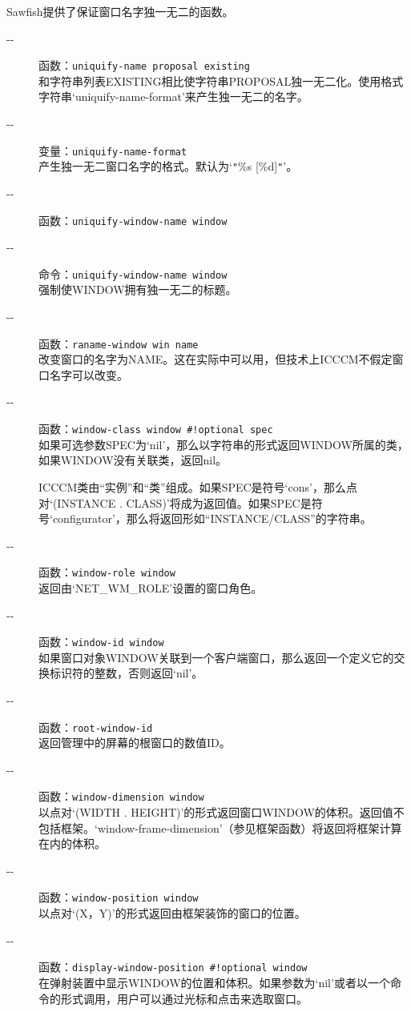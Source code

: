 \documentclass{book}
\begin{document}
\begin{CJK*}{UTF8}{gbsn}
Sawfish提供了保证窗口名字独一无二的函数。
\begin{description}
\item[-{}-] 函数：\verb|uniquify-name proposal existing|\\
和字符串列表EXISTING相比使字符串PROPOSAL独一无二化。使用格式字符串`uniquify-name-format'来产生独一无二的名字。
\item[-{}-] 变量：\verb|uniquify-name-format|\\
产生独一无二窗口名字的格式。默认为`\verb|"|\%s [\%d]\verb|"|'。
\item[-{}-] 函数：\verb|uniquify-window-name window|\\
\item[-{}-] 命令：\verb|uniquify-window-name window|\\
强制使WINDOW拥有独一无二的标题。
\item[-{}-] 函数：\verb|raname-window win name|\\
改变窗口的名字为NAME。这在实际中可以用，但技术上ICCCM不假定窗口名字可以改变。
\item[-{}-] 函数：\verb|window-class window #!optional spec|\\
如果可选参数SPEC为`nil'，那么以字符串的形式返回WINDOW所属的类，如果WINDOW没有关联类，返回nil。

ICCCM类由``实例''和``类''组成。如果SPEC是符号`cons'，那么点对`(INSTANCE . CLASS)'将成为返回值。如果SPEC是符号`configurator'，那么将返回形如``INSTANCE/CLASS''的字符串。
\item[-{}-] 函数：\verb|window-role window|\\
返回由`NET\_WM\_ROLE'设置的窗口角色。
\item[-{}-] 函数：\verb|window-id window|\\
如果窗口对象WINDOW关联到一个客户端窗口，那么返回一个定义它的交换标识符的整数，否则返回`nil'。
\item[-{}-] 函数：\verb|root-window-id|\\
返回管理中的屏幕的根窗口的数值ID。
\item[-{}-] 函数：\verb|window-dimension window|\\
以点对`(WIDTH . HEIGHT)'的形式返回窗口WINDOW的体积。返回值不包括框架。`window-frame-dimension'（参见框架函数）将返回将框架计算在内的体积。
\item[-{}-] 函数：\verb|window-position window|\\
以点对`(X，Y)'的形式返回由框架装饰的窗口的位置。
\item[-{}-] 函数：\verb|display-window-position #!optional window|\\
在弹射装置中显示WINDOW的位置和体积。如果参数为`nil'或者以一个命令的形式调用，用户可以通过光标和点击来选取窗口。


\end{description}
\end{CJK*}
\end{document}
